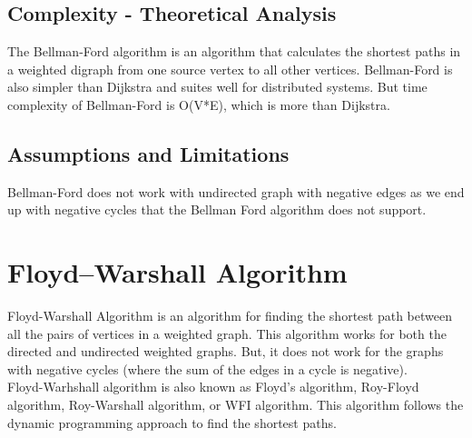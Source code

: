 \documentclass[a4paper, 12pt]{report}
\begin{document}
	\subsection{Complexity - Theoretical Analysis}
	The Bellman-Ford algorithm is an algorithm that calculates the shortest paths in a weighted digraph from one source vertex to all other vertices. Bellman-Ford is also simpler than Dijkstra and suites well for distributed systems. But time complexity of Bellman-Ford is O(V*E), which is more than Dijkstra.
	
	\subsection{Assumptions and Limitations}
	Bellman-Ford does not work with undirected graph with negative edges as we end up with negative cycles that the Bellman Ford algorithm does not support.
	
	\pagebreak
	\section{Floyd–Warshall Algorithm} 
	Floyd-Warshall Algorithm is an algorithm for finding the shortest path between all the pairs of vertices in a weighted graph. This algorithm works for both the directed and undirected weighted graphs. But, it does not work for the graphs with negative cycles (where the sum of the edges in a cycle is negative). \\
	
	Floyd-Warhshall algorithm is also known as Floyd's algorithm, Roy-Floyd algorithm, Roy-Warshall algorithm, or WFI algorithm. This algorithm follows the dynamic programming approach to find the shortest paths.
\end{document}
